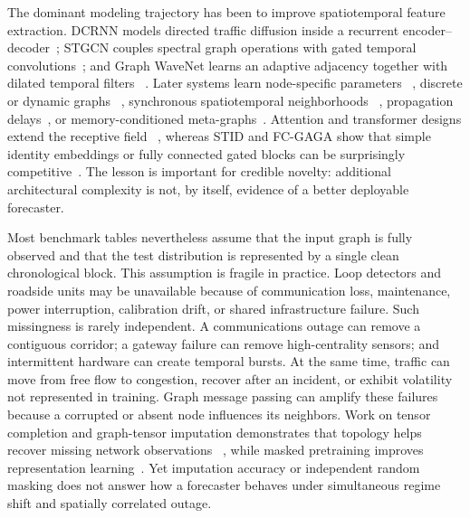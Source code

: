 \documentclass[preprint,12pt]{elsarticle}
\begin{document}
The dominant modeling trajectory has been to improve spatiotemporal feature
extraction. DCRNN models directed traffic diffusion inside a recurrent
encoder--decoder~\cite{li2018dcrnn}; STGCN couples spectral graph operations
with gated temporal convolutions~\cite{yu2018stgcn}; and Graph WaveNet learns an
adaptive adjacency together with dilated temporal filters
~\cite{wu2019graphwavenet}. Later systems learn node-specific parameters
~\cite{bai2020agcrn}, discrete or dynamic graphs
~\cite{shang2021gts,shao2022d2stgnn}, synchronous spatiotemporal neighborhoods
~\cite{song2020stsgcn}, propagation delays~\cite{jiang2023pdformer}, or
memory-conditioned meta-graphs~\cite{jiang2023megacrn}. Attention and
transformer designs extend the receptive field
~\cite{zheng2020gman,lan2022dstagnn,liu2023staeformer}, whereas STID and FC-GAGA
show that simple identity embeddings or fully connected gated blocks can be
surprisingly competitive~\cite{shao2022stid,oreshkin2021fcgaga}. The lesson is
important for credible novelty: additional architectural complexity is not, by
itself, evidence of a better deployable forecaster.

Most benchmark tables nevertheless assume that the input graph is fully
observed and that the test distribution is represented by a single clean
chronological block. This assumption is fragile in practice. Loop detectors
and roadside units may be unavailable because of communication loss,
maintenance, power interruption, calibration drift, or shared infrastructure
failure. Such missingness is rarely independent. A communications outage can
remove a contiguous corridor; a gateway failure can remove high-centrality
sensors; and intermittent hardware can create temporal bursts. At the same
time, traffic can move from free flow to congestion, recover after an incident,
or exhibit volatility not represented in training. Graph message passing can
amplify these failures because a corrupted or absent node influences its
neighbors. Work on tensor completion and graph-tensor imputation demonstrates
that topology helps recover missing network observations
~\cite{baggag2021tensor,xu2023graphtensor}, while masked pretraining improves
representation learning~\cite{sun2023stmae,gao2024stdmae}. Yet imputation
accuracy or independent random masking does not answer how a forecaster behaves
under simultaneous regime shift and spatially correlated outage.
\end{document}

